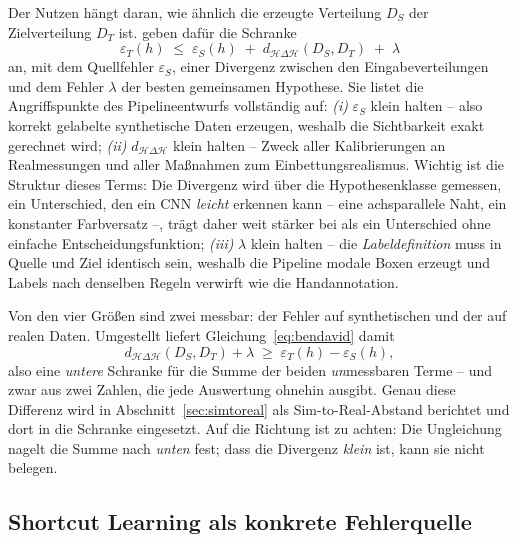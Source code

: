  Der Nutzen hängt daran,
wie ähnlich die erzeugte Verteilung $D_S$ der Zielverteilung $D_T$ ist.
\textcite{bendavid2010} geben dafür die Schranke
\begin{equation}
\varepsilon_T(h) \;\leq\; \varepsilon_S(h)
\;+\; d_{\mathcal{H}\Delta\mathcal{H}}(D_S, D_T) \;+\; \lambda
\label{eq:bendavid}
\end{equation}
an, mit dem Quellfehler $\varepsilon_S$, einer Divergenz zwischen den
Eingabeverteilungen und dem Fehler $\lambda$ der besten gemeinsamen Hypothese.
Sie listet die Angriffspunkte des Pipelineentwurfs vollständig auf:
\emph{(i)} $\varepsilon_S$ klein halten -- also korrekt gelabelte synthetische
Daten erzeugen, weshalb die Sichtbarkeit exakt gerechnet wird;
\emph{(ii)} $d_{\mathcal{H}\Delta\mathcal{H}}$ klein halten -- Zweck aller
Kalibrierungen an Realmessungen und aller Maßnahmen zum Einbettungsrealismus.
Wichtig ist die Struktur dieses Terms: Die Divergenz wird über die
Hypothesenklasse gemessen, ein Unterschied, den ein CNN \emph{leicht} erkennen
kann -- eine achsparallele Naht, ein konstanter Farbversatz --, trägt daher weit
stärker bei als ein Unterschied ohne einfache Entscheidungsfunktion;
\emph{(iii)} $\lambda$ klein halten -- die \emph{Labeldefinition} muss in Quelle
und Ziel identisch sein, weshalb die Pipeline modale Boxen erzeugt und Labels
nach denselben Regeln verwirft wie die Handannotation.

 Von den vier Größen sind zwei
messbar: der Fehler auf synthetischen und der auf realen Daten. Umgestellt liefert
Gleichung~\eqref{eq:bendavid} damit
\begin{equation}
d_{\mathcal{H}\Delta\mathcal{H}}(D_S, D_T) + \lambda \;\geq\;
\varepsilon_T(h) - \varepsilon_S(h),
\label{eq:bendavid-diff}
\end{equation}
also eine \emph{untere} Schranke für die Summe der beiden \emph{un}messbaren
Terme -- und zwar aus zwei Zahlen, die jede Auswertung ohnehin ausgibt. Genau
diese Differenz wird in Abschnitt~\ref{sec:simtoreal} als Sim-to-Real-Abstand
berichtet und dort in die Schranke eingesetzt. Auf die Richtung ist zu achten:
Die Ungleichung nagelt die Summe nach \emph{unten} fest; dass die Divergenz
\emph{klein} ist, kann sie nicht belegen.

\subsection{Shortcut Learning als konkrete Fehlerquelle}
\label{sec:shortcut}


